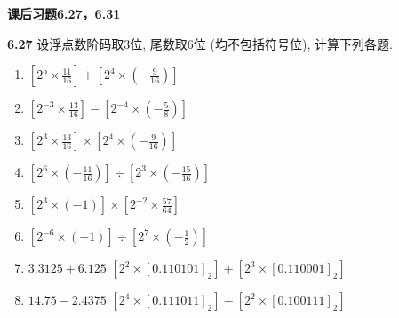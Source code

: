 \documentclass[UTF8]{report}
\newcommand{\problem}[1]{{\setlength{\parskip}{10pt}\noindent \bf{#1}}}
\begin{document}

\maketitle



\textbf{课后习题6.27，6.31}

\problem{6.27} 设浮点数阶码取$3$位, 尾数取$6$位 (均不包括符号位), 计算下列各题. 
\begin{enumerate}
    \item $\displaystyle   [2^{ 5} \times   \frac{11}{16} ] +      [2^{ 4} \times (-\frac{ 9}{16})]$
    \item $\displaystyle   [2^{-3} \times   \frac{13}{16} ] -      [2^{-4} \times (-\frac{ 5}{ 8})]$
    \item $\displaystyle   [2^{ 3} \times   \frac{13}{16} ] \times [2^{ 4} \times (-\frac{ 9}{16})]$
    \item $\displaystyle   [2^{ 6} \times (-\frac{11}{16})] \div   [2^{ 3} \times (-\frac{15}{16})]$
    \item $\displaystyle   [2^{ 3} \times (-1            )] \times [2^{-2} \times   \frac{57}{64} ]$
    \item $\displaystyle   [2^{-6} \times (-1            )] \div   [2^{ 7} \times (-\frac{ 1}{ 2})]$
    \item $  3.3125 + 6.125 $
          $\displaystyle   [2^{ 2} \times   [0.110101]_2  ] +      [2^{ 3} \times   [0.110001]_2  ]$
    \item $ 14.75  - 2.4375$
          $\displaystyle   [2^{ 4} \times   [0.111011]_2  ] -      [2^{ 2} \times   [0.100111]_2  ]$
\end{enumerate}
\end{document}
